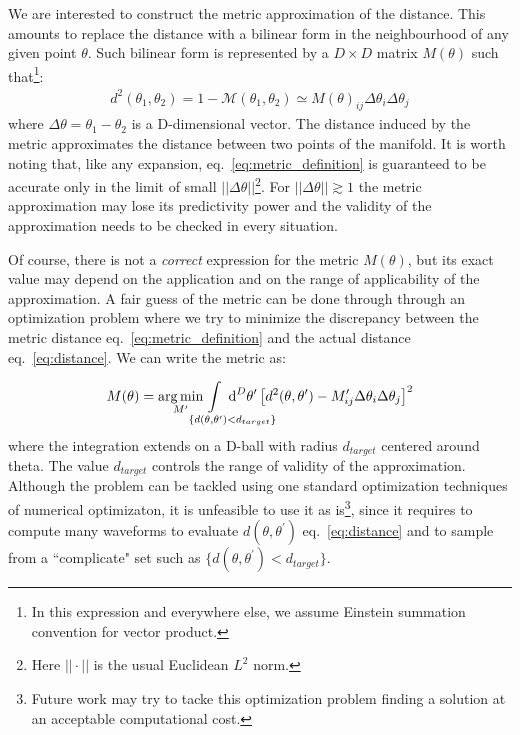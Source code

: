 \documentclass[twocolumn,showpacs,preprintnumbers,nofootinbib,prd,
superscriptaddress,10pt]{revtex4-2}
\newcommand{\dvol}[2]{\ensuremath{\operatorname{d}^{#2}\!{#1}}}
\DeclareMathOperator*{\argmin}{arg\,min}
\begin{document}
We are interested to construct the metric approximation of the distance. This amounts to replace the distance with a bilinear form in the neighbourhood of any given point $\theta$. Such bilinear form is represented by a $D\times D$ matrix $M(\theta)$ such that\footnote{
In this expression and everywhere else, we assume Einstein summation convention for vector product.}:
\begin{align}\label{eq:metric_definition}
	d^2(\theta_1,\theta_2) = 1 - \mathcal{M}(\theta_1,\theta_2) \simeq M(\theta)_{ij} \Delta\theta_i \Delta\theta_j
\end{align}
where $\Delta\theta = \theta_1-\theta_2$ is a D-dimensional vector.
The distance induced by the metric approximates the distance between two points of the manifold.
It is worth noting that, like any expansion, eq.~\eqref{eq:metric_definition} is guaranteed to be accurate only in the limit of small $||\Delta\theta||$\footnote{Here $||\cdot||$ is the usual Euclidean $L^2$ norm.}. For $||\Delta\theta|| \gtrsim 1$ the metric approximation may lose its predictivity power and the validity of the approximation needs to be checked in every situation.

Of course, there is not a {\it correct} expression for the metric $M(\theta)$, but its exact value may depend on the application and on the range of applicability of the approximation.
A fair guess of the metric can be done through through an optimization problem where we try to minimize the discrepancy between the metric distance eq.~\eqref{eq:metric_definition} and the actual distance eq.~\eqref{eq:distance}. We can write the metric as:

\begin{equation} \label{eq:metric_optmization}
	M(\theta) = \argmin_{M^\prime} \hspace{-4em} \int\limits_{\hspace{3em}\{d(\theta,\theta^\prime) < d_{target}\}} \hspace{-3.8em}
		\dvol{\theta^\prime}{D}  \left[ d^2(\theta,\theta^\prime) - M^\prime_{ij} \Delta\theta_i \Delta\theta_j
		\right]^2
\end{equation}
where the integration extends on a D-ball with radius $d_{target}$ centered around theta. The value $d_{target}$ controls the range of validity of the approximation.
Although the problem can be tackled using one standard optimization techniques of numerical optimizaton, it is unfeasible to use it as is\footnote{
Future work may try to tacke this optimization problem finding a solution at an acceptable computational cost.},
since it requires to compute many waveforms to evaluate $d(\theta,\theta^\prime)$ eq.~\eqref{eq:distance} and to sample from a ``complicate" set such as $\{d(\theta,\theta^\prime) < d_{target}\}$.
\end{document}
